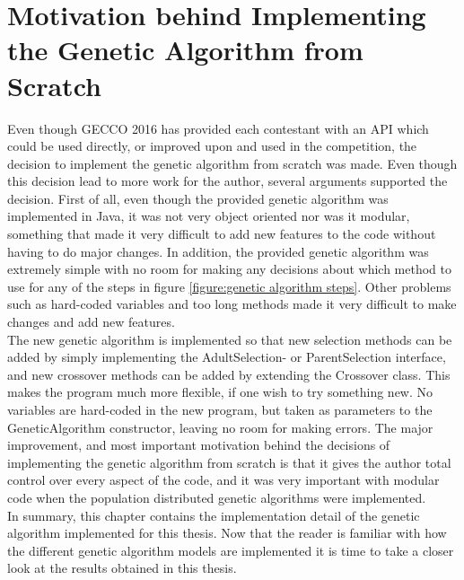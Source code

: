 \section[Motivation behind Implementing the GA from scratch]{Motivation behind Implementing the Genetic Algorithm from Scratch}\label{section:motivation}
Even though GECCO	 2016 has provided each contestant with an API which could be used directly, or improved upon and used in the competition, the decision to implement the genetic algorithm from scratch was made. Even though this decision lead to more work for the author, several arguments supported the decision. First of all, even though the provided genetic algorithm was implemented in Java, it was not very object oriented nor was it modular, something that made it very difficult to add new features to the code without having to do major changes. In addition, the provided genetic algorithm was extremely simple with no room for making any decisions about which method to use for any of the steps in figure \ref{figure:genetic algorithm steps}. Other problems such as hard-coded variables and too long methods made it very difficult to make changes and add new features. \\

\noindent The new genetic algorithm is implemented so that new selection methods can be added by simply implementing the AdultSelection- or ParentSelection interface, and new crossover methods can be added by extending the Crossover class. This makes the program much more flexible, if one wish to try something new. No variables are hard-coded in the new program, but taken as parameters to the GeneticAlgorithm constructor, leaving no room for making errors. The major improvement, and most important motivation behind the decisions of implementing the genetic algorithm from scratch is that it gives the author total control over every aspect of the code, and it was very important with modular code when the population distributed genetic algorithms were implemented.\\

\noindent In summary, this chapter contains the implementation detail of the genetic algorithm implemented for this thesis. Now that the reader is familiar with how the different genetic algorithm models are implemented it is time to take a closer look at the results obtained in this thesis. \\